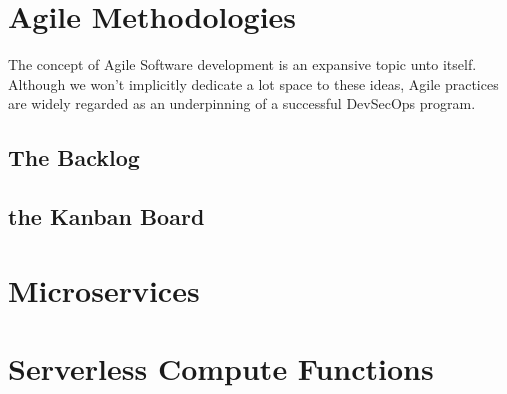 \section{Agile Methodologies}

\justify{}
The concept of Agile Software development is an expansive topic
unto itself. Although we won't implicitly dedicate a lot space to these
ideas, Agile practices are widely regarded as an underpinning of a successful
DevSecOps program.

\subsection{The Backlog}

\subsection{the Kanban Board}

\section{Microservices}

\section{Serverless Compute Functions}
